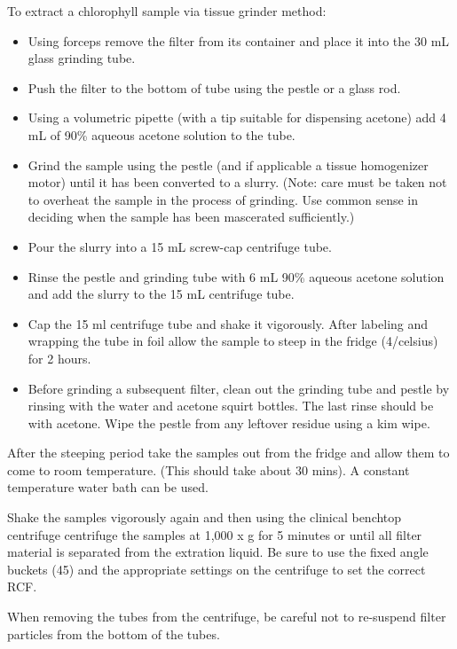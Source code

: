 \documentclass[12pt]{../SOP3}\usepackage[]{graphicx}\usepackage[]{color}
\begin{document}
\NP To extract a chlorophyll sample via tissue grinder method: 
\begin{itemize}
\item Using forceps remove the filter from its container and place it into the 30 mL glass grinding tube.
\item Push the filter to the bottom of tube using the pestle or a glass rod.
\item Using a volumetric pipette (with a tip suitable for dispensing acetone) add 4 mL of 90\% aqueous acetone solution to the tube.
\item Grind the sample using the pestle (and if applicable a tissue homogenizer motor) until it has been converted to a slurry. (Note: care must be taken not to overheat the sample in the process of grinding. Use common sense in deciding when the sample has been mascerated sufficiently.)
\item Pour the slurry into a 15 mL screw-cap centrifuge tube. 
\item Rinse the pestle and grinding tube with 6 mL 90\% aqueous acetone solution and add the slurry to the 15 mL centrifuge tube.
\item Cap the 15 ml centrifuge tube and shake it vigorously. After labeling and wrapping the tube in foil allow the sample to steep in the fridge (4/celsius) for 2 hours.
\item Before grinding a subsequent filter, clean out the grinding tube and pestle by rinsing with the water and acetone squirt bottles. The last rinse should be with acetone. Wipe the pestle from any leftover residue using a kim wipe.
\end{itemize}

\NP After the steeping period take the samples out from the fridge and allow them to come to room temperature. (This should take about 30 mins). A constant temperature water bath can be used.

\NP Shake the samples vigorously again and then using the clinical benchtop centrifuge centrifuge the samples at 1,000 x g for 5 minutes or until all filter material is separated from the extration liquid. Be sure to use the fixed angle buckets (45\degree) and the appropriate settings on the centrifuge to set the correct RCF. 

\NP When removing the tubes from the centrifuge, be careful not to re-suspend filter particles from the bottom of the tubes.

\end{document}
